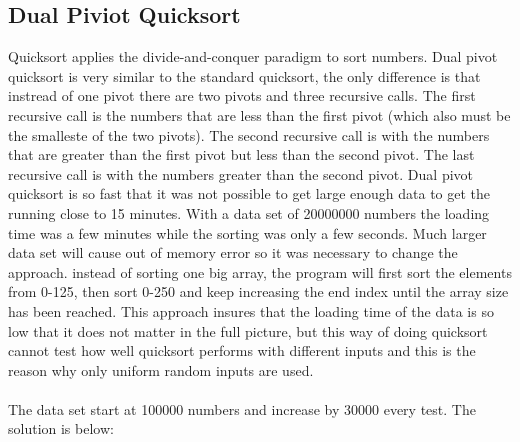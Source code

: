 \documentclass[a4paper, 11pt, titlepage]{article}
\begin{document}
\subsection{Dual Piviot Quicksort}
Quicksort applies the divide-and-conquer paradigm to sort numbers. Dual pivot quicksort is very similar to the standard quicksort, the only difference is that instread of one pivot there are two pivots and three recursive calls. The first recursive call is the numbers that are less than the first pivot (which also must be the smalleste of the two pivots). The second recursive call is with the numbers that are greater than the first pivot but less than the second pivot. The last recursive call is with the numbers greater than the second pivot. Dual pivot quicksort is so fast that it was not possible to get large enough data to get the running close to 15 minutes. With a data set of 20000000 numbers the loading time was a few minutes while the sorting was only a few seconds. Much larger data set will cause out of memory error so it was necessary to change the approach. instead of sorting one big array, the program will first sort the elements from 0-125, then sort 0-250 and keep increasing the end index until the array size has been reached. This approach insures that the loading time of the data is so low that it does not matter in the full picture, but this way of doing quicksort cannot test how well quicksort performs with different inputs and this is the reason why only uniform random inputs are used. \\
\\
The data set start at 100000 numbers and increase by 30000 every test. The solution is below:
\end{document}
